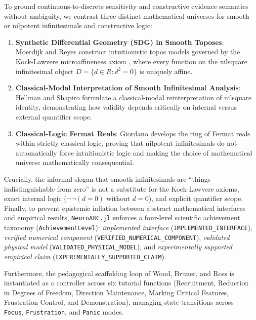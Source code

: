 To ground continuous-to-discrete sensitivity and constructive evidence semantics without ambiguity, we contrast three distinct mathematical universes for smooth or nilpotent infinitesimals and constructive logic:
\begin{enumerate}
  \item \textbf{Synthetic Differential Geometry (SDG) in Smooth Toposes}: Moerdijk and Reyes \cite{moerdijk1991models} construct intuitionistic topos models governed by the Kock-Lawvere microaffineness axiom \cite{bell2008primer,moerdijk1991models}, where every function on the nilsquare infinitesimal object $D = \{d \in R : d^2 = 0\}$ is uniquely affine.
  \item \textbf{Classical-Modal Interpretation of Smooth Infinitesimal Analysis}: Hellman and Shapiro \cite{hellman2025classical} formulate a classical-modal reinterpretation of nilsquare identity, demonstrating how validity depends critically on internal versus external quantifier scope.
  \item \textbf{Classical-Logic Fermat Reals}: Giordano \cite{giordano2010infinitesimals} develops the ring of Fermat reals within strictly classical logic, proving that nilpotent infinitesimals do not automatically force intuitionistic logic and making the choice of mathematical universe mathematically consequential.
\end{enumerate}
Crucially, the informal slogan that smooth infinitesimals are ``things indistinguishable from zero'' is not a substitute for the Kock-Lawvere axioms, exact internal logic ($\neg\neg(d=0)$ without $d=0$), and explicit quantifier scope. Finally, to prevent epistemic inflation between abstract mathematical interfaces and empirical results, \texttt{NeuroARC.jl} enforces a four-level scientific achievement taxonomy (\texttt{AchievementLevel}): \textit{implemented interface} (\texttt{IMPLEMENTED\_INTERFACE}), \textit{verified numerical component} (\texttt{VERIFIED\_NUMERICAL\_COMPONENT}), \textit{validated physical model} (\texttt{VALIDATED\_PHYSICAL\_MODEL}), and \textit{experimentally supported empirical claim} (\texttt{EXPERIMENTALLY\_SUPPORTED\_CLAIM}).
\fussy

Furthermore, the pedagogical scaffolding loop of Wood, Bruner, and Ross \cite{wood1976role} is instantiated as a controller across six tutorial functions (Recruitment, Reduction in Degrees of Freedom, Direction Maintenance, Marking Critical Features, Frustration Control, and Demonstration), managing state transitions across \texttt{Focus}, \texttt{Frustration}, and \texttt{Panic} modes.
